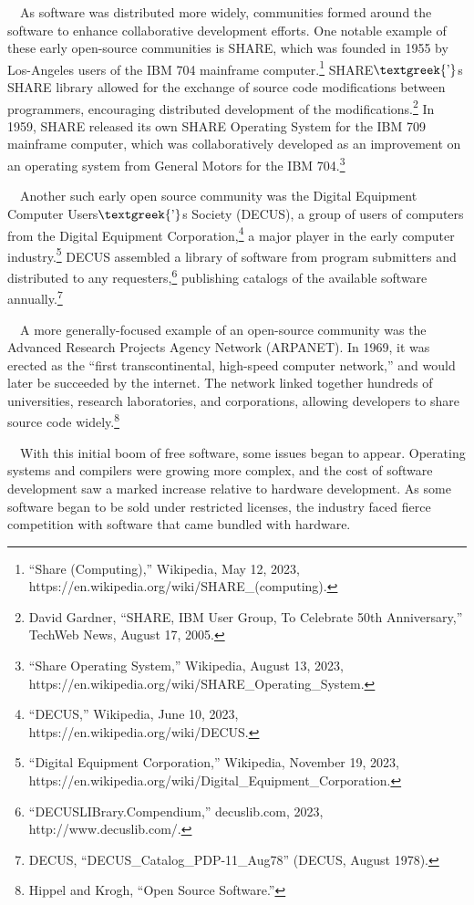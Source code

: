 \documentclass{article}
\begin{document}
\ \ As software was distributed more widely, communities formed around the software to enhance collaborative development
efforts. One notable example of these early open-source communities is SHARE, which was founded in 1955 by Los-Angeles
users of the IBM 704 mainframe computer.\footnote{“Share (Computing),” Wikipedia, May 12, 2023,
https://en.wikipedia.org/wiki/SHARE\_(computing).} SHARE$\text{\textgreek{’}}$s SHARE library allowed for the exchange
of source code modifications between programmers, encouraging distributed development of the
modifications.\footnote{David Gardner, “SHARE, IBM User Group, To Celebrate 50th Anniversary,” TechWeb News, August 17,
2005.} In 1959, SHARE released its own SHARE Operating System for the IBM 709 mainframe computer, which was
collaboratively developed as an improvement on an operating system from General Motors for the IBM 704.\footnote{“Share
Operating System,” Wikipedia, August 13, 2023, https://en.wikipedia.org/wiki/SHARE\_Operating\_System.}

\ \ Another such early open source community was the Digital Equipment Computer Users$\text{\textgreek{’}}$s Society
(DECUS), a group of users of computers from the Digital Equipment Corporation,\footnote{“DECUS,” Wikipedia, June 10,
2023, https://en.wikipedia.org/wiki/DECUS.} a major player in the early computer industry.\footnote{“Digital Equipment
Corporation,” Wikipedia, November 19, 2023, https://en.wikipedia.org/wiki/Digital\_Equipment\_Corporation.} DECUS
assembled a library of software from program submitters and distributed to any
requesters,\footnote{“DECUSLIBrary.Compendium,” decuslib.com, 2023, http://www.decuslib.com/.} publishing catalogs of
the available software annually.\footnote{DECUS, “DECUS\_Catalog\_PDP-11\_Aug78” (DECUS, August 1978).}

\ \ A more generally-focused example of an open-source community was the Advanced Research Projects Agency Network
(ARPANET). In 1969, it was erected as the “first transcontinental, high-speed computer network,” and would later be
succeeded by the internet. The network linked together hundreds of universities, research laboratories, and
corporations, allowing developers to share source code widely.\footnote{Hippel and Krogh, “Open Source Software.”}

\ \ With this initial boom of free software, some issues began to appear. Operating systems and compilers were growing
more complex, and the cost of software development saw a marked increase relative to hardware development. As some
software began to be sold under restricted licenses, the industry faced fierce competition with software that came
bundled with hardware. 
\end{document}
